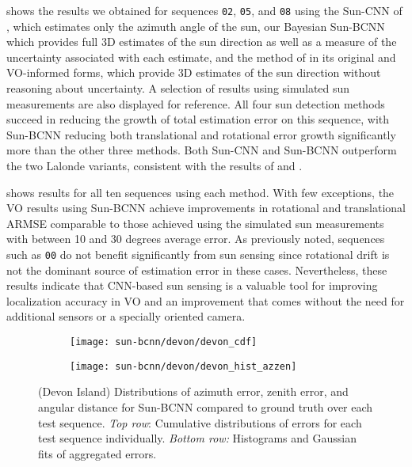  shows the results we obtained for sequences \texttt{02}, \texttt{05}, and \texttt{08} using the Sun-CNN of \citet{Ma2016-at}, which estimates only the azimuth angle of the sun, our Bayesian Sun-BCNN which provides full 3D estimates of the sun direction as well as a measure of the uncertainty associated with each estimate, and the method of \citet{Lalonde2011-jw} in its original and VO-informed \citep{Clement2016-ir} forms, which provide 3D estimates of the sun direction without reasoning about uncertainty.
A selection of results using simulated sun measurements are also displayed for reference.
All four sun detection methods succeed in reducing the growth of total estimation error on this sequence, with Sun-BCNN reducing both translational and rotational error growth significantly more than the other three methods.
Both Sun-CNN and Sun-BCNN outperform the two Lalonde variants, consistent with the results of \citet{Ma2016-at} and \citet{Clement2016-ir}.

 shows results for all ten sequences using each method.
With few exceptions, the VO results using Sun-BCNN achieve improvements in rotational and translational ARMSE comparable to those achieved using the simulated sun measurements with between 10 and 30 degrees average error.
As previously noted, sequences such as \texttt{00} do not benefit significantly from sun sensing since rotational drift is not the dominant source of estimation error in these cases.
Nevertheless, these results indicate that CNN-based sun sensing is a valuable tool for improving localization accuracy in VO and an improvement that comes without the need for additional sensors or a specially oriented camera.

\begin{figure}
    \centering
    \begin{subfigure}[b]{0.75\textwidth}
        \texttt{[image: sun-bcnn/devon/devon\_cdf]}
    \end{subfigure} 
    \begin{subfigure}[b]{0.75\textwidth}
        \texttt{[image: sun-bcnn/devon/devon\_hist\_azzen]}
    \end{subfigure}
    \caption{(Devon Island) Distributions of azimuth error, zenith error, and angular distance for Sun-BCNN compared to ground truth over each test sequence. \emph{Top row}: Cumulative distributions of errors for each test sequence individually. \emph{Bottom row:} Histograms and Gaussian fits of aggregated errors.}
    \label{fig:sun-bcnn_devon_cnn_testerrors}
\end{figure}

